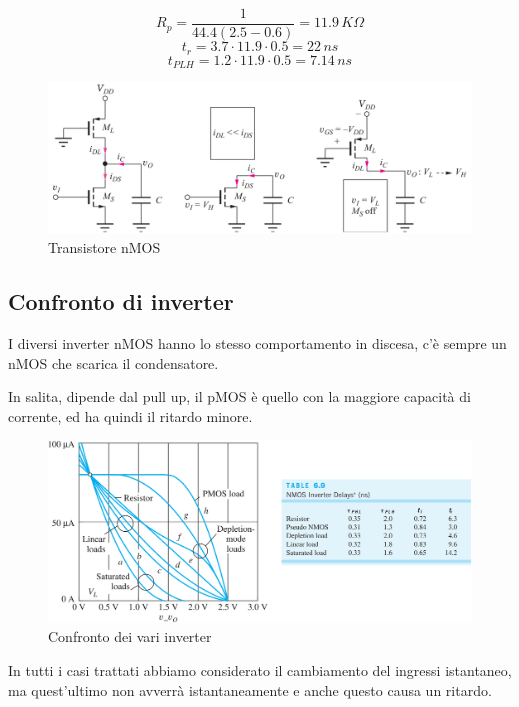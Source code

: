 \begin{equation*}
    R_p = \frac{1}{44.4(2.5-0.6)} = 11.9\,K\Omega
\end{equation*}
\begin{equation*}
    t_r = 3.7\cdot11.9\cdot0.5 = 22\,ns
\end{equation*}
\begin{equation*}
    t_{PLH} = 1.2\cdot11.9\cdot0.5 = 7.14 \,ns
\end{equation*}

\begin{figure}[htbp]
    \centering
    \includegraphics[width=0.85\linewidth]{img/transitorio_nMOS.png}
    \caption{Transistore nMOS}
    
\end{figure}


\subsection{Confronto di inverter}
I	diversi	inverter	nMOS hanno	lo	stesso	comportamento	
in	discesa, c’è	sempre	un	nMOS che	scarica	il	condensatore.

In	salita,	dipende	dal	pull	up, il	pMOS è	quello	con	la	maggiore	capacità	di	corrente,	ed	ha	
quindi	il	ritardo	minore.


\begin{figure}[htbp]
    \centering
    \includegraphics[width=0.75\linewidth]{img/cfr_inverter.png}
    \caption{Confronto dei vari inverter}    
\end{figure}

In tutti i casi trattati abbiamo considerato il cambiamento del ingressi istantaneo, ma quest'ultimo non avverrà istantaneamente e anche questo causa un ritardo.

